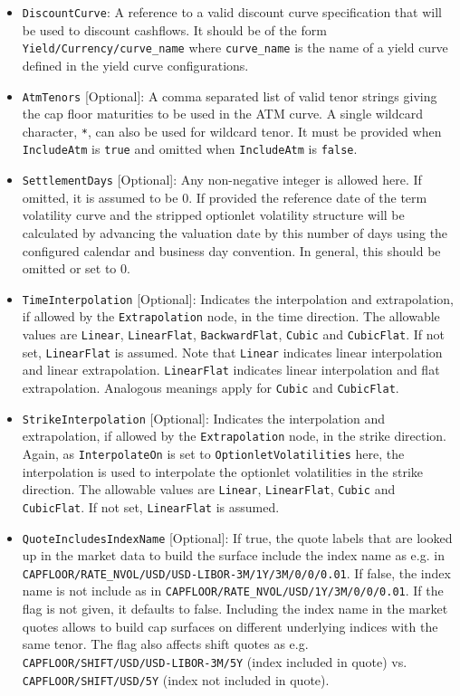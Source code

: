 \begin{itemize}
\item \lstinline!DiscountCurve!:
A reference to a valid discount curve specification that will be used to discount cashflows. It should be of the form \lstinline!Yield/Currency/curve_name! where \lstinline!curve_name! is the name of a yield curve defined in the yield curve configurations.

\item \lstinline!AtmTenors! [Optional]:
A comma separated list of valid tenor strings giving the cap floor maturities to be used in the ATM curve. A single wildcard character, \lstinline!*!, can also be used for wildcard tenor. It must be provided when \lstinline!IncludeAtm! is \lstinline!true! and omitted when \lstinline!IncludeAtm! is \lstinline!false!.

\item \lstinline!SettlementDays! [Optional]:
Any non-negative integer is allowed here. If omitted, it is assumed to be 0. If provided the reference date of the term volatility curve and the stripped optionlet volatility structure will be calculated by advancing the valuation date by this number of days using the configured calendar and business day convention. In general, this should be omitted or set to 0.

\item \lstinline!TimeInterpolation! [Optional]:
Indicates the interpolation and extrapolation, if allowed by the \lstinline!Extrapolation! node, in the time direction. The allowable values are \lstinline!Linear!, \lstinline!LinearFlat!, \lstinline!BackwardFlat!, \lstinline!Cubic! and \lstinline!CubicFlat!. If not set, \lstinline!LinearFlat! is assumed. Note that \lstinline!Linear! indicates linear interpolation and linear extrapolation. \lstinline!LinearFlat! indicates linear interpolation and flat extrapolation. Analogous meanings apply for \lstinline!Cubic! and \lstinline!CubicFlat!.

\item \lstinline!StrikeInterpolation! [Optional]:
Indicates the interpolation and extrapolation, if allowed by the \lstinline!Extrapolation! node, in the strike direction. Again, as \lstinline!InterpolateOn! is set to \lstinline!OptionletVolatilities! here, the interpolation is used to interpolate the optionlet volatilities in the strike direction. The allowable values are \lstinline!Linear!, \lstinline!LinearFlat!, \lstinline!Cubic! and \lstinline!CubicFlat!. If not set, \lstinline!LinearFlat! is assumed.

\item \lstinline!QuoteIncludesIndexName! [Optional]:
If true, the quote labels that are looked up in the market data to build the surface include the index name as e.g. in \lstinline!CAPFLOOR/RATE_NVOL/USD/USD-LIBOR-3M/1Y/3M/0/0/0.01!. If false, the index name is not include as in \lstinline!CAPFLOOR/RATE_NVOL/USD/1Y/3M/0/0/0.01!. If the flag is not given, it defaults to false. Including the index name in the market quotes allows to build cap surfaces on different underlying indices with the same tenor. The flag also affects shift quotes as e.g. \lstinline!CAPFLOOR/SHIFT/USD/USD-LIBOR-3M/5Y! (index included in quote) vs. \lstinline!CAPFLOOR/SHIFT/USD/5Y! (index not included in quote).


\end{itemize}
